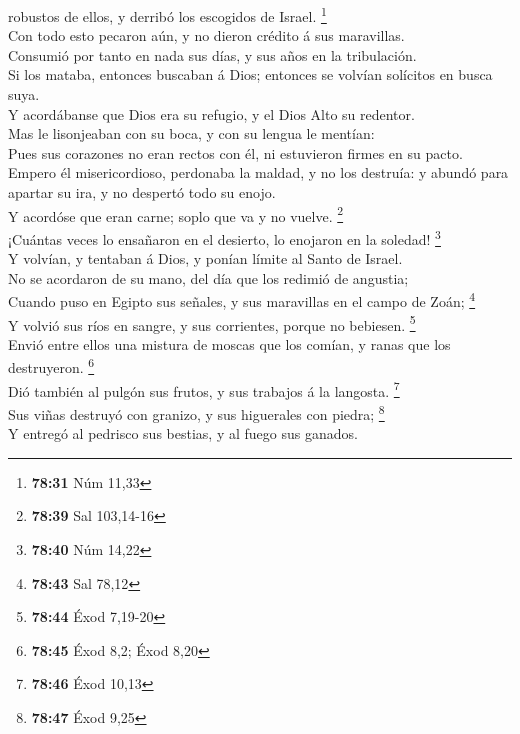 robustos de ellos, y derribó los escogidos de Israel. \footnote{\textbf{78:31}
  Núm 11,33}\\
 Con todo esto pecaron aún, y no dieron crédito á sus
maravillas.\\
 Consumió por tanto en nada sus días, y sus años en la
tribulación.\\
 Si los mataba, entonces buscaban á Dios; entonces se
volvían solícitos en busca suya.\\
 Y acordábanse que Dios era su refugio, y el Dios Alto su
redentor.\\
 Mas le lisonjeaban con su boca, y con su lengua le
mentían:\\
 Pues sus corazones no eran rectos con él, ni estuvieron
firmes en su pacto.\\
 Empero él misericordioso, perdonaba la maldad, y no los
destruía: y abundó para apartar su ira, y no despertó todo su enojo.\\
 Y acordóse que eran carne; soplo que va y no vuelve.
\footnote{\textbf{78:39} Sal 103,14-16}\\
 ¡Cuántas veces lo ensañaron en el desierto, lo enojaron
en la soledad! \footnote{\textbf{78:40} Núm 14,22}\\
 Y volvían, y tentaban á Dios, y ponían límite al Santo
de Israel.\\
 No se acordaron de su mano, del día que los redimió de
angustia;\\
 Cuando puso en Egipto sus señales, y sus maravillas en
el campo de Zoán; \footnote{\textbf{78:43} Sal 78,12}\\
 Y volvió sus ríos en sangre, y sus corrientes, porque no
bebiesen. \footnote{\textbf{78:44} Éxod 7,19-20}\\
 Envió entre ellos una mistura de moscas que los comían,
y ranas que los destruyeron. \footnote{\textbf{78:45} Éxod 8,2; Éxod
  8,20}\\
 Dió también al pulgón sus frutos, y sus trabajos á la
langosta. \footnote{\textbf{78:46} Éxod 10,13}\\
 Sus viñas destruyó con granizo, y sus higuerales con
piedra; \footnote{\textbf{78:47} Éxod 9,25}\\
 Y entregó al pedrisco sus bestias, y al fuego sus
ganados.\\
